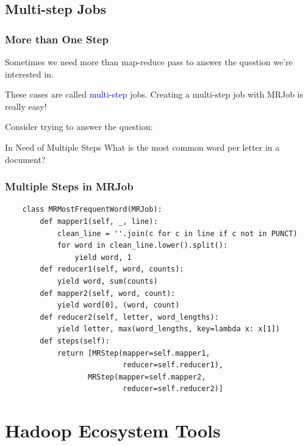 \documentclass{beamer}
\begin{document}
\subsection{Multi-step Jobs}
\begin{frame}
  \frametitle{More than One Step}
  Sometimes we need more than map-reduce pass to answer the question we're interested in.
  \vspace{2mm}

  These cases are called \textcolor{blue}{multi-step} jobs. Creating a multi-step job with MRJob is really easy! \pause
  \vspace{2mm}

  Consider trying to answer the question:
  \begin{block}{In Need of Multiple Steps}
    What is the most common word per letter in a document?
  \end{block}
\end{frame}

\begin{frame}[fragile]
  \frametitle{Multiple Steps in MRJob}
  \begin{lstlisting}
    class MRMostFrequentWord(MRJob):
        def mapper1(self, _, line):
            clean_line = ''.join(c for c in line if c not in PUNCT)
            for word in clean_line.lower().split():
                yield word, 1
        def reducer1(self, word, counts):
            yield word, sum(counts)
        def mapper2(self, word, count):
            yield word[0], (word, count)
        def reducer2(self, letter, word_lengths):
            yield letter, max(word_lengths, key=lambda x: x[1])
        def steps(self):
            return [MRStep(mapper=self.mapper1,
                           reducer=self.reducer1),
                   MRStep(mapper=self.mapper2,
                           reducer=self.reducer2)]
  \end{lstlisting}
\end{frame}

\section{Hadoop Ecosystem Tools}
\end{document}
